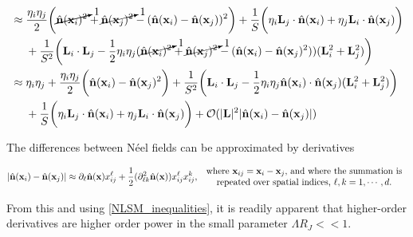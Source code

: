 \begin{equation}
    \begin{split}
        &\approx \frac{\eta_i \eta_j}{2} \bigg(\cancelto{1}{\hat{{\bf n}}({\bf x}_i)^2} + \cancelto{1}{\hat{{\bf n}}({\bf x}_j)^2} - (\hat{{\bf n}}({\bf x}_i) - \hat{{\bf n}}({\bf x}_j))^2\bigg) + \frac{1}{S} \bigg(\eta_i {\bf L}_j \cdot\hat{{\bf n}}({\bf x}_i) + \eta_j {\bf L}_i \cdot\hat{{\bf n}}({\bf x}_j) \bigg) \\
        & \textnormal{ } \textnormal{ } \textnormal{ } \textnormal{ } + \frac{1}{S^2} \bigg({\bf L}_i  \cdot {\bf L}_j - \frac{1}{2} \eta_i \eta_j (\cancelto{1}{\hat{{\bf n}}({\bf x}_i)^2} + \cancelto{1}{\hat{{\bf n}}({\bf x}_j)^2} - (\hat{{\bf n}}({\bf x}_i) - \hat{{\bf n}}({\bf x}_j)^2)) ({\bf L}_i^2 + {\bf L}_j^2) \bigg) \\
        &\approx \eta_i \eta_j + \frac{\eta_i \eta_j}{2} \bigg(\hat{{\bf n}}({\bf x}_i) - \hat{{\bf n}}({\bf x}_j)^2\bigg) + \frac{1}{S^2} \bigg({\bf L}_i  \cdot {\bf L}_j - \frac{1}{2} \eta_i \eta_j \hat{{\bf n}}({\bf x}_i) \cdot \hat{{\bf n}}({\bf x}_j) ({\bf L}_i^2 + {\bf L}_j^2) \bigg) \\
        & \textnormal{ } \textnormal{ } \textnormal{ } \textnormal{ } + \frac{1}{S} \bigg(\eta_i {\bf L}_j \cdot\hat{{\bf n}}({\bf x}_i) + \eta_j {\bf L}_i \cdot\hat{{\bf n}}({\bf x}_j) \bigg) + \mathcal{O}(|{\bf L}|^2 |\hat{{\bf n}}({\bf x}_i)-\hat{{\bf n}}({\bf x}_j)|) 
    \end{split}
\end{equation}

The differences between Néel fields can be approximated by derivatives 

\begin{equation}
    |\hat{{\bf n}}({\bf x}_i)-\hat{{\bf n}}({\bf x}_j)| \approx \partial_{\ell} \hat{{\bf n}}({\bf x}) x_{ij}^{\ell} + \frac{1}{2} (\partial_{\ell k}^2 \hat{{\bf n}}({\bf x})) x_{ij}^{\ell} x_{ij}^{k}, \begin{array}{cc}
         \textnormal{ where ${\bf x}_{ij} = {\bf x}_i - {\bf x}_j $, and where the summation is}  \\
         \textnormal{  repeated over spatial indices, $\ell, k = 1, \cdots, d$.}
    \end{array}
\end{equation}

From this and using \cref{NLSM_inequalities}, it is readily apparent that higher-order derivatives are higher order power in the small parameter $\Lambda R_J << 1$. \\


